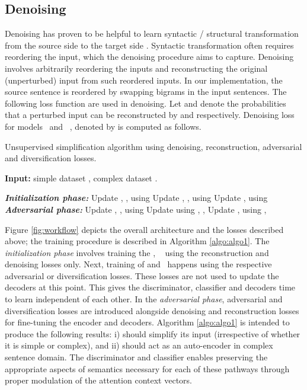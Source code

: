 \documentclass[11pt,a4paper]{article}
\begin{document}
\subsection{Denoising}
\label{sec:denoising}
Denoising has proven to be helpful to learn syntactic / structural transformation from the source side to the target side \cite{artetxe2018iclr}. Syntactic transformation often requires reordering the input, which the denoising procedure aims to capture. Denoising involves arbitrarily reordering the inputs and reconstructing the original (unperturbed) input from such reordered inputs. In our implementation, the source sentence is reordered by swapping bigrams in the input sentences. The following loss function are used in denoising. Let  and  denote the probabilities that a perturbed input  can be reconstructed by  and  respectively. Denoising loss for models \simplf\ and \compl\ , denoted by  is computed as follows.

\begin{algorithm}[t]
\caption{Unsupervised simplification algorithm using denoising, reconstruction, adversarial and diversification losses. }
\label{algo:algo1}
\textbf{Input:} simple dataset , complex dataset .
\begin{algorithmic}
\State \textbf{\textit{Initialization phase:}}
\Repeat
\State Update , ,  using 
\State Update , ,  using 
\State Update ,  using  
\State \textbf{\textit{Adversarial phase:}}
\Repeat
\State Update , ,  using 
\State Update  using , , 
\State Update ,  using , 
\end{algorithmic}
\end{algorithm}


Figure \ref{fig:workflow} depicts the overall architecture and the losses described above; the training procedure is described in Algorithm \ref{algo:algo1}. The \textit{initialization phase} involves training the \simplf, \compl~ using the reconstruction and denoising losses only. Next, training of  and \C\ happens using the respective adversarial or diversification losses. These losses are not used to update the decoders at this point. This gives the discriminator, classifier and decoders time to learn independent of each other. In the \textit{adversarial phase}, adversarial and diversification losses are introduced alongside denoising and reconstruction losses for fine-tuning the encoder and decoders. Algorithm \ref{algo:algo1} is intended to produce the following results: i)  should simplify its input (irrespective of whether it is simple or complex), and
ii)  should act as an auto-encoder in complex sentence domain. The discriminator and classifier enables preserving the appropriate aspects of semantics necessary for each of these pathways through proper modulation of the attention context vectors. 
\end{document}
